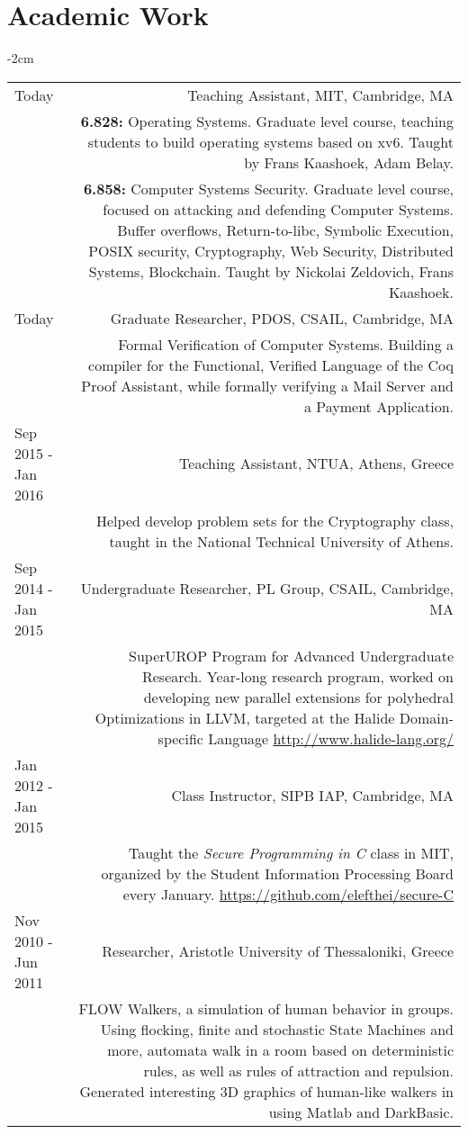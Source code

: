 \documentclass[lettersize,10pt]{article}
\begin{document}
\section{Academic Work}
\begin{adjustwidth}{}{-2cm}
  \begin{tabularx}{\textwidth}{L R}
	Today & {\sc Teaching Assistant, MIT}, Cambridge, MA \\
	& \textbf{6.828:} Operating Systems. Graduate level course, teaching students to build operating systems based on xv6.
	Taught by Frans Kaashoek, Adam Belay. \\
	& \textbf{6.858:} Computer Systems Security. Graduate level course, focused on attacking and defending Computer Systems.
	Buffer overflows, Return-to-libc, Symbolic Execution, POSIX security, Cryptography, Web Security, Distributed Systems, Blockchain.
	Taught by Nickolai Zeldovich, Frans Kaashoek. \\

    Today & {\sc Graduate Researcher, PDOS, CSAIL}, Cambridge, MA \\
    & Formal Verification of Computer Systems. Building a compiler for
    the Functional, Verified Language of the Coq Proof Assistant, while formally verifying a Mail Server and a Payment Application. \\

	Sep 2015 - Jan 2016 & {\sc Teaching Assistant, NTUA}, Athens, Greece \\
	& Helped develop problem sets for the Cryptography class, taught in the National Technical University of Athens. \\

    Sep 2014 - Jan 2015 & {\sc Undergraduate Researcher, PL Group, CSAIL}, Cambridge, MA \\
    & SuperUROP Program for Advanced Undergraduate Research. Year-long research program, worked on developing new parallel extensions for
	polyhedral Optimizations in LLVM, targeted at the Halide Domain-specific Language \url{http://www.halide-lang.org/} \\

	Jan 2012 - Jan 2015 & {\sc Class Instructor, SIPB IAP}, Cambridge, MA \\
	& Taught the \emph{Secure Programming in C} class in MIT, organized by the Student Information Processing Board every January.
    \url{https://github.com/elefthei/secure-C} \\

    Nov 2010 - Jun 2011 & {\sc Researcher, Aristotle University of Thessaloniki}, Greece \\
    &  FLOW Walkers, a simulation of human behavior in groups. Using flocking, finite and stochastic State Machines and more, automata walk
    in a room based on deterministic rules, as well as rules of attraction and repulsion. Generated interesting
    3D graphics of human-like walkers in using Matlab and DarkBasic. \\
  \end{tabularx}
\end{adjustwidth}
\end{document}
